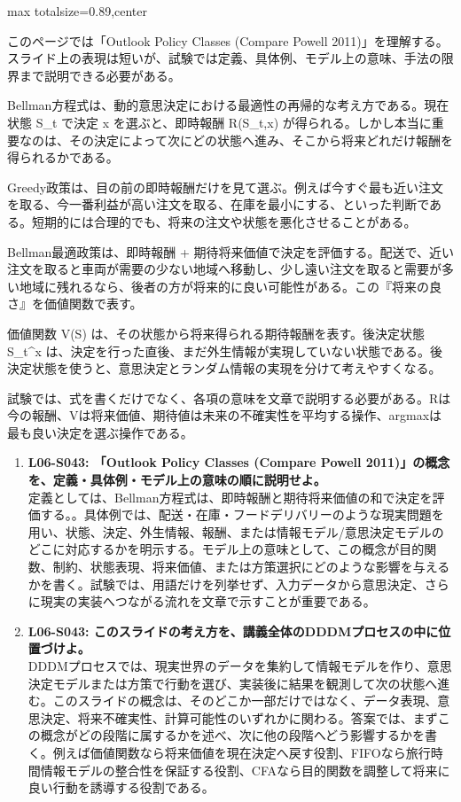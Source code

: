 \begin{minipage}[t]{0.58\textwidth}
\begin{adjustbox}{max totalsize={\textwidth}{0.89\textheight},center}
\begin{minipage}{\textwidth}\scriptsize
{}このページでは「Outlook Policy Classes (Compare Powell 2011)」を理解する。スライド上の表現は短いが、試験では定義、具体例、モデル上の意味、手法の限界まで説明できる必要がある。\par
Bellman方程式は、動的意思決定における最適性の再帰的な考え方である。現在状態 S\_t で決定 x を選ぶと、即時報酬 R(S\_t,x) が得られる。しかし本当に重要なのは、その決定によって次にどの状態へ進み、そこから将来どれだけ報酬を得られるかである。\par
Greedy政策は、目の前の即時報酬だけを見て選ぶ。例えば今すぐ最も近い注文を取る、今一番利益が高い注文を取る、在庫を最小にする、といった判断である。短期的には合理的でも、将来の注文や状態を悪化させることがある。\par
Bellman最適政策は、即時報酬 + 期待将来価値で決定を評価する。配送で、近い注文を取ると車両が需要の少ない地域へ移動し、少し遠い注文を取ると需要が多い地域に残れるなら、後者の方が将来的に良い可能性がある。この『将来の良さ』を価値関数で表す。\par
価値関数 V(S) は、その状態から将来得られる期待報酬を表す。後決定状態 S\_t\textasciicircum{}x は、決定を行った直後、まだ外生情報が実現していない状態である。後決定状態を使うと、意思決定とランダム情報の実現を分けて考えやすくなる。\par
試験では、式を書くだけでなく、各項の意味を文章で説明する必要がある。Rは今の報酬、Vは将来価値、期待値は未来の不確実性を平均する操作、argmaxは最も良い決定を選ぶ操作である。\par{}\begin{enumerate}\item \textbf{L06-S043: 「Outlook Policy Classes (Compare Powell 2011)」の概念を、定義・具体例・モデル上の意味の順に説明せよ。}\\定義としては、Bellman方程式は、即時報酬と期待将来価値の和で決定を評価する。。具体例では、配送・在庫・フードデリバリーのような現実問題を用い、状態、決定、外生情報、報酬、または情報モデル/意思決定モデルのどこに対応するかを明示する。モデル上の意味として、この概念が目的関数、制約、状態表現、将来価値、または方策選択にどのような影響を与えるかを書く。試験では、用語だけを列挙せず、入力データから意思決定、さらに現実の実装へつながる流れを文章で示すことが重要である。\item \textbf{L06-S043: このスライドの考え方を、講義全体のDDDMプロセスの中に位置づけよ。}\\DDDMプロセスでは、現実世界のデータを集約して情報モデルを作り、意思決定モデルまたは方策で行動を選び、実装後に結果を観測して次の状態へ進む。このスライドの概念は、そのどこか一部だけではなく、データ表現、意思決定、将来不確実性、計算可能性のいずれかに関わる。答案では、まずこの概念がどの段階に属するかを述べ、次に他の段階へどう影響するかを書く。例えば価値関数なら将来価値を現在決定へ戻す役割、FIFOなら旅行時間情報モデルの整合性を保証する役割、CFAなら目的関数を調整して将来に良い行動を誘導する役割である。\end{enumerate}

\end{minipage}
\end{adjustbox}
\end{minipage}
